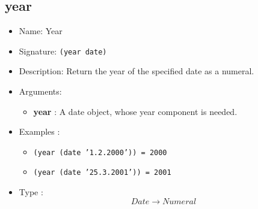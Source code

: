 \subsection{year}
\begin{itemize}
    \item Name: Year
    \item Signature: \texttt{(year date)}
    \item Description: Return the year of the specified date as a numeral.
    \item Arguments:
        \begin{itemize}
            \item \textbf{year} : A date object, whose year component is needed.
        \end{itemize}
    \item Examples :
        \begin{itemize}
            \item \texttt{(year (date '1.2.2000')) = 2000}
            \item \texttt{(year (date '25.3.2001')) = 2001}
        \end{itemize}
    \item Type : \[ Date \to Numeral \]
\end{itemize}
